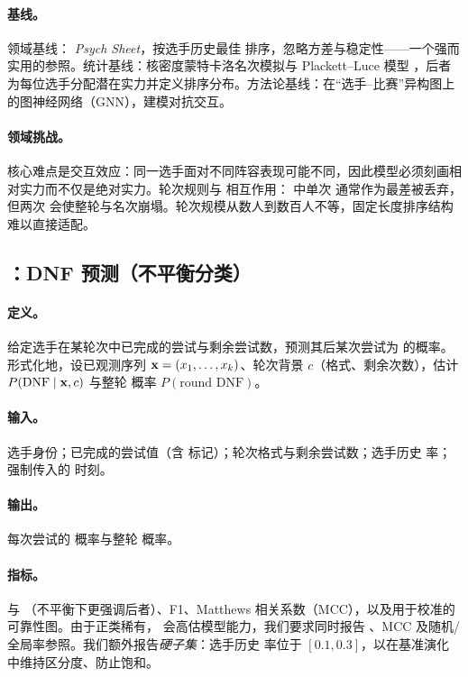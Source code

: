 \paragraph{基线。}领域基线：\wca{} \emph{Psych Sheet}，按选手历史最佳  排序，忽略方差与稳定性——一个强而实用的参照。统计基线：核密度蒙特卡洛名次模拟与 Plackett--Luce 模型 \citep{plackett_luce}，后者为每位选手分配潜在实力并定义排序分布。方法论基线：在“选手--比赛”异构图上的图神经网络（GNN），建模对抗交互。

\paragraph{领域挑战。}核心难点是交互效应：同一选手面对不同阵容表现可能不同，因此模型必须刻画相对实力而不仅是绝对实力。轮次规则与 \DNF{} 相互作用： 中单次 \DNF{} 通常作为最差被丢弃，但两次 \DNF{} 会使整轮与名次崩塌。轮次规模从数人到数百人不等，固定长度排序结构难以直接适配。

\subsection{：DNF 预测（不平衡分类）}
\label{sec:task3}

\paragraph{定义。}给定选手在某轮次中已完成的尝试与剩余尝试数，预测其后某次尝试为 \DNF{} 的概率。形式化地，设已观测序列 $\mathbf{x} = (x_1, \dots, x_{k})$、轮次背景 $c$（格式、剩余次数），估计 $P(\text{DNF} \mid \mathbf{x}, c)$ 与整轮 \DNF{} 概率 $P(\text{round DNF})$。

\paragraph{输入。}选手身份；已完成的尝试值（含 \DNF{} 标记）；轮次格式与剩余尝试数；选手历史 \DNF{} 率；强制传入的 \asof{} 时刻。

\paragraph{输出。}每次尝试的 \DNF{} 概率与整轮 \DNF{} 概率。

\paragraph{指标。}\aucroc{} 与 \aucpr{}（不平衡下更强调后者）、F1、Matthews 相关系数（MCC），以及用于校准的可靠性图。由于正类稀有，\aucroc{} 会高估模型能力，我们要求同时报告 \aucpr{}、MCC 及随机/全局率参照。我们额外报告\emph{硬子集}：选手历史 \DNF{} 率位于 $[0.1, 0.3]$，以在基准演化中维持区分度、防止饱和。

